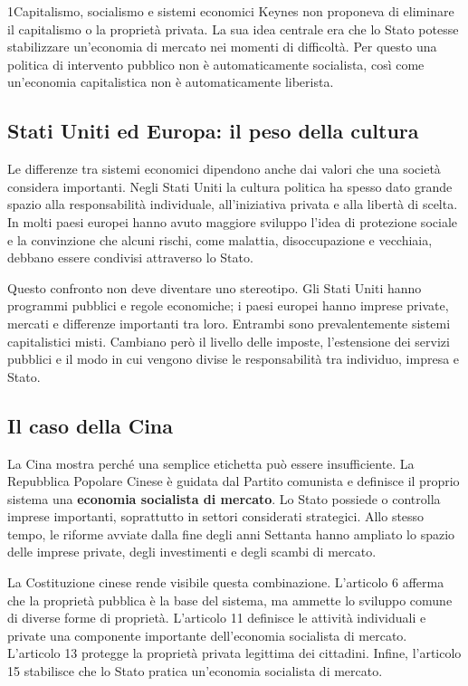 \begin{lettura}{1}{Capitalismo, socialismo e sistemi economici}
Keynes non proponeva di eliminare il capitalismo o la proprietà privata. La sua idea centrale era che lo Stato potesse stabilizzare un'economia di mercato nei momenti di difficoltà. Per questo una politica di intervento pubblico non è automaticamente socialista, così come un'economia capitalistica non è automaticamente liberista.

\subsection*{Stati Uniti ed Europa: il peso della cultura}
Le differenze tra sistemi economici dipendono anche dai valori che una società considera importanti. Negli Stati Uniti la cultura politica ha spesso dato grande spazio alla responsabilità individuale, all'iniziativa privata e alla libertà di scelta. In molti paesi europei hanno avuto maggiore sviluppo l'idea di protezione sociale e la convinzione che alcuni rischi, come malattia, disoccupazione e vecchiaia, debbano essere condivisi attraverso lo Stato.

Questo confronto non deve diventare uno stereotipo. Gli Stati Uniti hanno programmi pubblici e regole economiche; i paesi europei hanno imprese private, mercati e differenze importanti tra loro. Entrambi sono prevalentemente sistemi capitalistici misti. Cambiano però il livello delle imposte, l'estensione dei servizi pubblici e il modo in cui vengono divise le responsabilità tra individuo, impresa e Stato.

\subsection*{Il caso della Cina}
La Cina mostra perché una semplice etichetta può essere insufficiente. La Repubblica Popolare Cinese è guidata dal Partito comunista e definisce il proprio sistema una \textbf{economia socialista di mercato}. Lo Stato possiede o controlla imprese importanti, soprattutto in settori considerati strategici. Allo stesso tempo, le riforme avviate dalla fine degli anni Settanta hanno ampliato lo spazio delle imprese private, degli investimenti e degli scambi di mercato.

La Costituzione cinese rende visibile questa combinazione. L'articolo 6 afferma che la proprietà pubblica è la base del sistema, ma ammette lo sviluppo comune di diverse forme di proprietà. L'articolo 11 definisce le attività individuali e private una componente importante dell'economia socialista di mercato. L'articolo 13 protegge la proprietà privata legittima dei cittadini. Infine, l'articolo 15 stabilisce che lo Stato pratica un'economia socialista di mercato.


\end{lettura}
